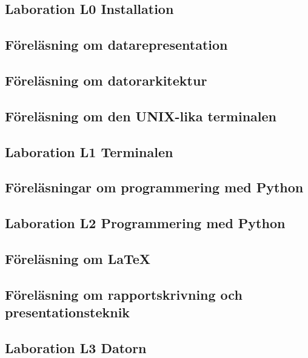 \documentclass[a4paper,logo]{miunart}
\begin{document}
\subsection{Laboration L0 Installation}


\subsection{Föreläsning om datarepresentation}


\subsection{Föreläsning om datorarkitektur}


\subsection{Föreläsning om den UNIX-lika terminalen}


\subsection{Laboration L1 Terminalen}


\subsection{Föreläsningar om programmering med Python}


\subsection{Laboration L2 Programmering med Python}


\subsection{Föreläsning om \LaTeX}


\subsection{Föreläsning om rapportskrivning och presentationsteknik}


\subsection{Laboration L3 Datorn}

\end{document}
